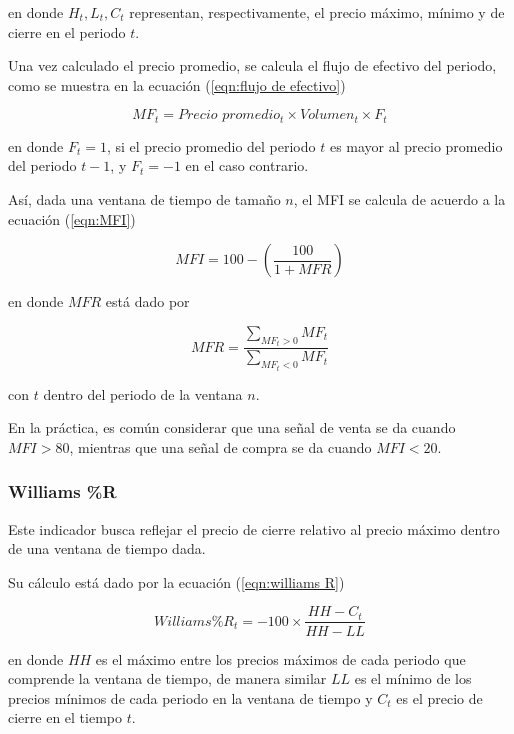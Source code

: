 \documentclass[12pt]{scrbook}
\theoremstyle{break}
\theoremstyle{break}
\begin{document}
en donde $H_{t}, L_t, C_t$ representan, respectivamente, el precio máximo, mínimo y de cierre en el periodo $t$.

Una vez calculado el precio promedio, se calcula el flujo de efectivo del periodo, como se muestra en la ecuación (\ref{eqn:flujo de efectivo})

\begin{equation} \label{eqn:flujo de efectivo}
MF_t = Precio\, \, promedio_t \times Volumen_t \times F_t
\end{equation}

en donde $F_t = 1$, si el precio promedio del periodo $t$ es mayor al precio promedio del periodo $t-1$, y $F_t = -1$ en el caso contrario.

Así, dada una ventana de tiempo de tamaño $n$, el MFI se calcula de acuerdo a la ecuación (\ref{eqn:MFI})

\begin{equation} \label{eqn:MFI}
MFI = 100 - \left( \frac{100}{1 + MFR} \right)
\end{equation}

en donde $MFR$ está dado por 

\begin{equation} \label{eqn:MFR}
MFR = \dfrac{\sum_{MF_t > 0} MF_t  }{\sum_{MF_t < 0} MF_t}
\end{equation}

con $t$ dentro del periodo de la ventana $n$.

En la práctica, es común considerar que una señal de venta se da cuando $MFI > 80$, mientras que una señal de compra se da cuando $MFI < 20$.

\subsubsection{Williams \%R}
\label{subsubseccion:Williams R}
Este indicador busca reflejar el precio de cierre relativo al precio máximo dentro de una ventana de tiempo dada.

Su cálculo está dado por la ecuación (\ref{eqn:williams R})

\begin{equation} \label{eqn:williams R}
Williams \%R_t = -100 \times \dfrac{HH - C_t}{HH - LL}
\end{equation}

en donde $HH$ es el máximo entre los precios máximos de cada periodo que comprende la ventana de tiempo, de manera similar $LL$ es el mínimo de los precios mínimos de cada periodo en la ventana de tiempo y $C_t$ es el precio de cierre en el tiempo $t$.
\end{document}
